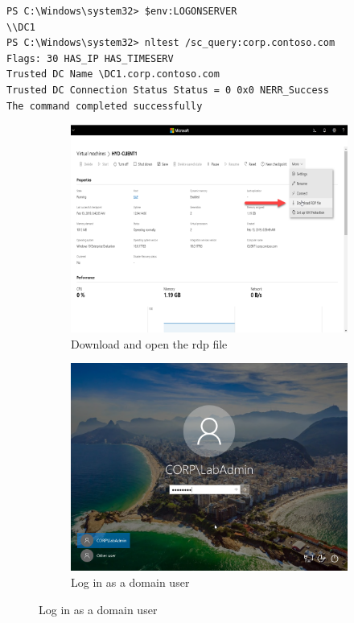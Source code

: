 \begin{lstlisting}[breaklines]
PS C:\Windows\system32> $env:LOGONSERVER
\\DC1
PS C:\Windows\system32> nltest /sc_query:corp.contoso.com
Flags: 30 HAS_IP HAS_TIMESERV
Trusted DC Name \DC1.corp.contoso.com
Trusted DC Connection Status Status = 0 0x0 NERR_Success
The command completed successfully
\end{lstlisting}

\begin{figure}[h]
	\begin{subfigure}{0.5\textwidth}
	\captionsetup{width=0.8\linewidth}
	\includegraphics[width=0.9\linewidth]{img/Methodologie/Verification0.png}
	\centering
	\caption{Download and open the \acrshort{rdp} file}
\end{subfigure}
\begin{subfigure}{0.5\textwidth}
	\captionsetup{width=0.8\linewidth}
	\includegraphics[width=0.9\linewidth]{img/Methodologie/Verification1.png} 
	\centering
	\caption{Log in as a domain user}
\end{subfigure}
\end{figure}
